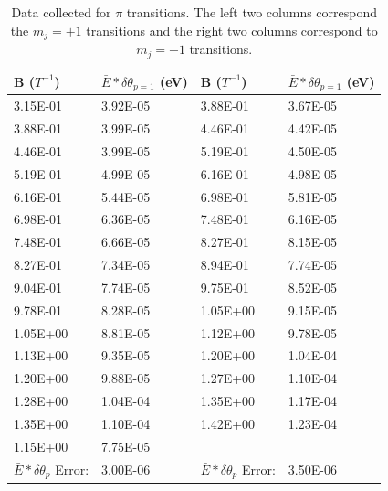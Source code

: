 \documentclass[12pt]{article}
\begin{document}
\begin{table}[h!]\centering
\begin{tabular}{ |p{3cm}|p{3cm}||p{3cm}|p{3cm}|}
 \hline
  B ($T^{-1}$)& $\bar{E} * \delta\theta_{p=1} $ (eV)& B ($T^{-1}$) & $\bar{E} *\delta\theta_{p=1}$ (eV) \\
 \hline
3.15E-01&	3.92E-05&	3.88E-01&	3.67E-05\\
3.88E-01&	3.99E-05&	4.46E-01&	4.42E-05\\
4.46E-01&	3.99E-05&	5.19E-01&	4.50E-05\\
5.19E-01&	4.99E-05&	6.16E-01&	4.98E-05\\
6.16E-01&	5.44E-05&	6.98E-01&	5.81E-05\\
6.98E-01&	6.36E-05&	7.48E-01&	6.16E-05\\
7.48E-01&	6.66E-05&	8.27E-01&	8.15E-05\\
8.27E-01&	7.34E-05&	8.94E-01&	7.74E-05\\
9.04E-01&	7.74E-05&	9.75E-01&	8.52E-05\\
9.78E-01&	8.28E-05&	1.05E+00&	9.15E-05\\
1.05E+00&	8.81E-05&	1.12E+00&	9.78E-05\\
1.13E+00&	9.35E-05&	1.20E+00&	1.04E-04\\
1.20E+00&	9.88E-05&	1.27E+00&	1.10E-04\\
1.28E+00&	1.04E-04&	1.35E+00&	1.17E-04\\
1.35E+00&	1.10E-04&	1.42E+00&	1.23E-04\\
1.15E+00&	7.75E-05& &\\
\hline
$\bar{E} * \delta\theta_p$ Error: & 3.00E-06 & $\bar{E} * \delta\theta_p$ Error:  & 3.50E-06\\
\hline
\end{tabular}
\def\sym#1{\ifmmode^{#1}\else\(^{#1}\)\fi}
\caption{Data collected for $\pi$ transitions. The left two columns correspond the $m_j = +1$ transitions and the right two columns correspond to $m_j = -1$ transitions.}
\label{tab:pitrans}
\end{table}
\end{document}
